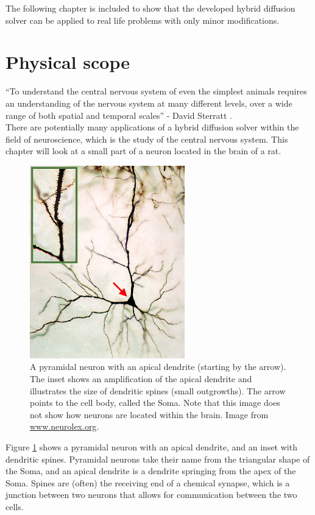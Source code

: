 The following chapter is included to show that the developed hybrid diffusion solver can be applied to real life problems with only minor modifications.

\section{Physical scope}
``To understand the central nervous system of even the simplest animals requires an understanding of the nervous system at many different levels, over a wide range of both spatial and temporal scales'' - David Sterratt \cite{graham2011principles}.\\

\noindent There are potentially many applications of a hybrid diffusion solver within the field of neuroscience, which is the study of the central nervous system. 
This chapter will look at a small part of a neuron located in the brain of a rat.
\begin{figure}[H]
 \centering
 \includegraphics[width=0.6\textwidth]{Figures/Cochlear_nucleus_multipolar_cell.jpg}
 \caption[Pyramidal neuron]{A pyramidal neuron with an apical dendrite (starting by the arrow). The inset shows an amplification of the apical dendrite and illustrates the size of dendritic spines (small outgrowths). The arrow points to the cell body, called the Soma. Note that this image does not show how neurons are located within the brain. Image from \url{www.neurolex.org}.}
 \label{application:pyramidal_neuron}
\end{figure}

Figure \ref{application:pyramidal_neuron} shows a pyramidal neuron with an apical dendrite, and an inset with dendritic spines. 
Pyramidal neurons take their name from the triangular shape of the Soma, and an apical dendrite is a dendrite springing from the apex of the Soma. 
Spines are (often) the receiving end of a chemical synapse, which is a junction between two neurons that allows for communication between the two cells. \\

